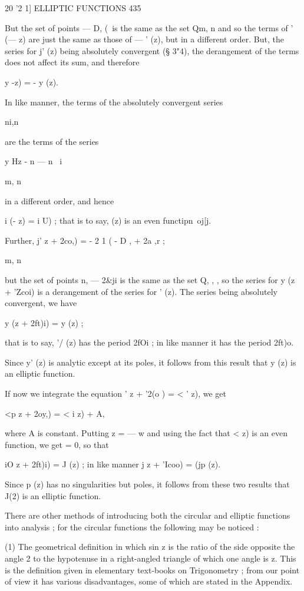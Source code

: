 {20 '2 1] ELLIPTIC FUNCTIONS 435

But the set of points — D, (\ is the same as the set Qm, n and so the
terms of ' (— z) are just the same as those of — ' (z), but in a
different order. But, the series for j' (z) being absolutely
convergent (§ 3"4), the derangement of the terms does not affect its
sum, and therefore

 y -z) = - y (z).

In like manner, the terms of the absolutely convergent series

ni,n

are the terms of the series

y Hz - n — n~ i

m, n

in a different order, and hence

i (- z) = i U) ; that is to say, (z) is an even functipn\ oj[j.

Further, j' z + 2co,) = - 2 1 ( - D , + 2a ,r ;

m, n

but the set of points n, — 2\&ji is the same as the set Q, , , so the
series for y (z + 'Zcoi) is a derangement of the series for ' (z). The
series being absolutely convergent, we have

 y (z + 2ft)i) = y (z) ;

that is to say, '/ (z) has the period 2fOi ; in like manner it has the
period 2ft)o.

Since y' (z) is analytic except at its poles, it follows from this
result that y (z) is an elliptic function.

If now we integrate the equation ' z + '2(o ) = < ' z), we get

<p z + 2oy,) = < i z) + A,

where A is constant. Putting z = — w and using the fact that < z) is
an even function, we get = 0, so that

iO z + 2ft)i) = J (z) ; in like manner j z + 'Icoo) = (jp (z).

Since p (z) has no singularities but poles, it follows from these two
results that J(2) is an elliptic function.

There are other methods of introducing both the circular and elliptic
functions into analysis ; for the circular functions the following may
be noticed :

(1) The geometrical definition in which sin z is the ratio of the side
opposite the angle 2 to the hypotenuse in a right-angled triangle of
which one angle is z. This is the definition given in elementary
text-books on Trigonometry ; from our point of view it has various
disadvantages, some of which are stated in the Appendix.

}
